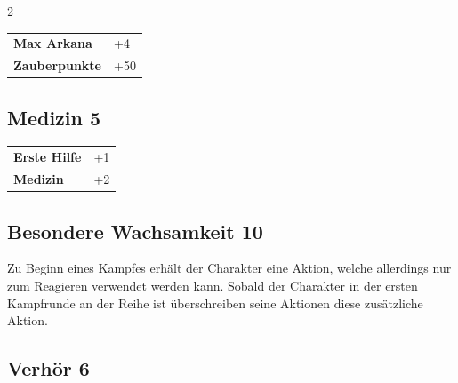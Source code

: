 \begin{multicols}{2}
\begin{tcolorbox}
\begin{tabular}{@{}ll@{}}
    \textbf{Max Arkana} & +4\\
    \textbf{Zauberpunkte} & +50\\
\end{tabular}


\end{tcolorbox}

\begin{tcolorbox}
    \subsection*{Medizin \hfill \small{5 }}
    \tcblower




\begin{tabular}{@{}ll@{}}
    \textbf{Erste Hilfe} & +1\\
    \textbf{Medizin} & +2\\
\end{tabular}


\end{tcolorbox}

\begin{tcolorbox}
    \subsection*{Besondere Wachsamkeit \hfill \small{10 }}
    \tcblower
Zu Beginn eines Kampfes erhält der Charakter eine Aktion, welche allerdings nur zum Reagieren verwendet werden kann. Sobald der Charakter in der ersten Kampfrunde an der Reihe ist überschreiben seine Aktionen diese zusätzliche Aktion.


\vspace{3mm}



\end{tcolorbox}

\begin{tcolorbox}
    \subsection*{Verhör \hfill \small{6 }}
    \tcblower





\end{tcolorbox}
\end{multicols}
